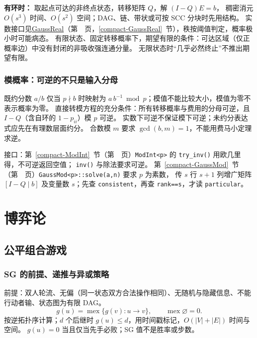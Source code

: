 \textbf{有环时：} 取起点可达的非终点状态，转移矩阵 $Q$，解 $(I-Q)E=b$，
稠密消元 $O(s^3)$ 时间、$O(s^2)$ 空间；DAG、链、带状或可按 SCC 分块时先用结构。
实数接口见\hyperref[compact-GaussReal]{GaussReal}（第~\pageref{compact-GaussReal}~页，\ref{compact-GaussReal}~节），秩按阈值判定，概率极小时可能病态。
有限状态、固定转移概率下，期望有限的条件：可达区域（仅正概率边）中没有封闭的非吸收强连通分量。
无限状态时“几乎必然终止”不推出期望有限。



\subsection{模概率：可逆的不只是输入分母}\label{knowledge-mod-probability}
既约分数 $a/b$ 仅当 $p\nmid b$ 时映射为 $a\,b^{-1}\bmod p$；模值不能比较大小，模值为零不表示概率为零。
直接转模方程的充分条件：所有转移概率与费用的分母可逆，且 $I-Q$（含自环的 $1-p_{ii}$）模 $p$ 可逆。
实数下可逆不保证模下可逆；未约分表达式应先在有理数层面约分。
合数模 $m$ 要求 $\gcd(b,m)=1$，不能用费马小定理求逆。

接口：第~\ref{compact-ModInt}~节（第~\pageref{compact-ModInt}~页）\texttt{ModInt<p>} 的 \texttt{try\_inv()} 用欧几里得，不可逆返回空值；
\texttt{inv()} 与除法要求可逆。
第~\ref{compact-GaussMod}~节（第~\pageref{compact-GaussMod}~页）\texttt{GaussMod<p>::solve(a,n)} 要求 $p$ 为素数，
传 $s$ 行 $s+1$ 列增广矩阵 $[I-Q\mid b]$ 及变量数 $s$；先查 \texttt{consistent}，再查 \texttt{rank==s}，才读 \texttt{particular}。



\Needspace{180pt}

\chapter{博弈论}

\section{公平组合游戏}

\subsection{SG 的前提、递推与异或策略}\label{knowledge-sg}
前提：双人轮流、无偏（同一状态双方合法操作相同）、无随机与隐藏信息、不能行动者输、状态图为有限 DAG。
\[
g(u)=\operatorname{mex}\{g(v):u\to v\},\qquad
\operatorname{mex}\varnothing=0.
\]
按逆拓扑序计算；$d$ 个后继时 $g(u)\le d$，用时间戳标记，$O(|V|+|E|)$ 时间与空间。
$g(u)=0$ 当且仅当先手必败；SG 值不是胜率或步数。


